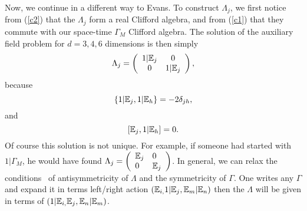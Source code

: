 \documentclass[a4paper,12pt]{book}
\begin{document}
Now, we continue in a different way to Evans. To construct $\Lambda _{j}$,
we first notice from (\ref{c2}) that the $\Lambda _{j}$ form a real Clifford
algebra, and from (\ref{c1}) that they commute with our space-time $\Gamma
_{M}$ Clifford algebra. The solution of the auxiliary field problem for $%
d=3,4,6$ dimensions is then simply 
\begin{equation}
\Lambda _{j}=\left( 
\begin{array}{cc}
1|\Bbb{E}_{j} & 0 \\ 
0 & 1|\Bbb{E}_{j}
\end{array}
\right) ,  \label{lam}
\end{equation}
because 
\begin{equation}
\left\{ 1|\Bbb{E}_{j},1|\Bbb{E}_{h}\right\} =-2\delta _{jh},
\end{equation}
and 
\begin{equation}
\left[ \Bbb{E}_{j},1|\Bbb{E}_{h}\right] =0.
\end{equation}
Of course this solution is not unique. For example, if someone had started
with $1|\Gamma _{M}$, he would have found $\Lambda _{j}=\left( 
\begin{array}{ll}
\Bbb{E}_{j} & 0 \\ 
0 & \Bbb{E}_{j}
\end{array}
\right) $. In general, we can relax the conditions \ of antisymmetricity of $%
\Lambda $ and the symmetricity of $\Gamma .$ One writes any $\Gamma $ and
expand it in terms left/right action $\left( \Bbb{E}_{i,}1|\Bbb{E}_{j},\Bbb{E%
}_{m}|\Bbb{E}_{n}\right) $ then the $\Lambda $ will be given in terms of $%
\left( 1|\Bbb{E}_{i,}\Bbb{E}_{j},\Bbb{E}_{n}|\Bbb{E}_{m}\right) $.
\end{document}
